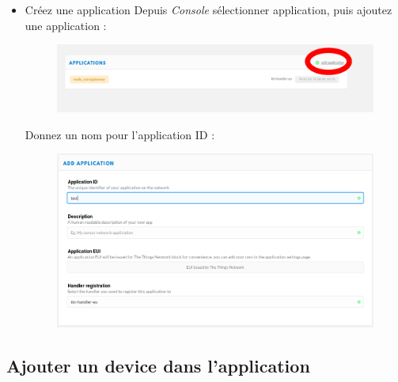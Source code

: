 \documentclass{article}
\begin{document}
\begin{itemize}


    \item Créez une application
    Depuis \textit{Console} sélectionner application, puis ajoutez une application :
    
    
    \begin{figure}[H]
\begin{center}
\advance\leftskip-3cm
\advance\rightskip-3cm
\includegraphics[keepaspectratio=true,scale=0.4]{add_appli.png}
\label{visina8}
\end{center}\end{figure}
    
    Donnez un nom pour l'application ID :
    
     \begin{figure}[H]
\begin{center}
\advance\leftskip-3cm
\advance\rightskip-3cm
\includegraphics[keepaspectratio=true,scale=0.4]{appli_id.png}
\label{visina8}
\end{center}\end{figure}

\end{itemize}
    
    \subsection{Ajouter un device dans l'application}
    
\end{document}
